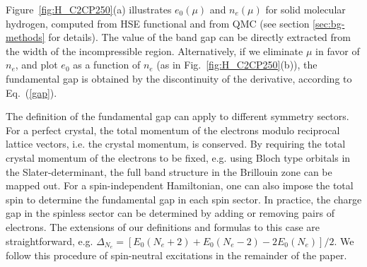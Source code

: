 Figure~\ref{fig:H_C2CP250}(a) illustrates $e_0(\mu)$ and $n_e(\mu)$ for solid molecular hydrogen, computed from HSE functional and from QMC (see section \ref{sec:bg-methods} for details). The value of the  band
gap can be directly extracted from the width of the incompressible region.
Alternatively, if we
eliminate $\mu$ in favor of $n_e$, and plot $e_0$ as a function of $n_e$ (as in Fig.~\ref{fig:H_C2CP250}(b)),
the fundamental gap is obtained by the discontinuity of the derivative, according to 
Eq.~(\ref{gap}).

The definition of the fundamental gap can apply to different symmetry sectors.
For a perfect crystal, the total momentum of the electrons modulo 
reciprocal lattice vectors, i.e. the crystal momentum, is conserved. By requiring the total crystal momentum of the electrons to be fixed,
e.g. using Bloch type orbitals in the Slater-determinant,
the full band structure in the Brillouin zone can be mapped out.
For a spin-independent Hamiltonian, one can also impose the total spin 
to determine the fundamental gap in each spin sector. %
In practice, the charge gap in the spinless sector can
be determined by  adding or removing pairs of electrons. The extensions of our definitions and formulas to this case are straightforward,
e.g. $\Delta_{N_e}=[E_0(N_e+2)+E_0(N_e-2)-2E_0(N_e)]/2$. We follow this procedure of spin-neutral excitations in the remainder of the paper.


